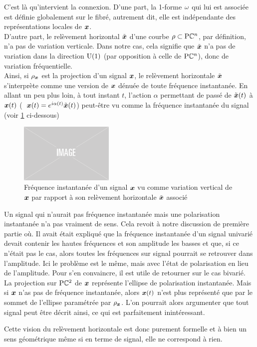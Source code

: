 C'est là qu'intervient la connexion. D'une part, la 1-forme $\omega$ qui lui est associée est définie globalement sur le fibré, autrement dit, elle est indépendante des représentations locales de $\boldsymbol{x}$.
\\
D'autre part, le relèvement horizontal $\Tilde{\boldsymbol{x}}$ d'une courbe $\rho\subset\text{\normalfont P}\mathbb{C}^{n}$, par définition, n'a pas de variation verticale. Dans notre cas, cela signifie que $\Tilde{\boldsymbol{x}}$ n'a pas de variation dans la direction $\text{\normalfont U}(1)$ (par opposition à celle de $\text{\normalfont P}\mathbb{C}^{n}$), donc de variation fréquentielle.
\\
Ainsi, si $\rho_{\boldsymbol{x}}$ est la projection d'un signal $\boldsymbol{x}$, le relèvement horizontale $\Tilde{\boldsymbol{x}}$ s'interprète comme une version de $\boldsymbol{x}$ dénuée de toute fréquence instantanée.
En allant un peu plus loin, à tout instant $t$, l'action $\alpha$ permettant de passé de $\Tilde{\boldsymbol{x}}(t)$ à $\boldsymbol{x}(t)$ (\ie~$\boldsymbol{x}(t) = e^{i\alpha(t)} \Tilde{\boldsymbol{x}}(t)$) peut-être vu comme la fréquence instantanée du signal (voir \cref{fig:freq_inst_geodiff} ci-dessous)

\begin{figure}[h]
	\includegraphics[width=0.4\textwidth]{fig/placeholder}
	\caption[Interprétation géométrique de la fréquence instantanée]{Fréquence instantanée d'un signal $\boldsymbol{x}$ vu comme variation vertical de $\boldsymbol{x}$ par rapport à son relèvement horizontale $\Tilde{\boldsymbol{x}}$ associé}
	\label{fig:freq_inst_geodiff}
\end{figure}	

\begin{remarque}
	Un signal qui n'aurait pas fréquence instantanée mais une polarisation instantanée n'a pas vraiment de sens. 
	Cela revoit à notre discussion de première partie où. Il avait était expliqué que la fréquence instantanée d'un signal univarié devait contenir les hautes fréquences et son amplitude les basses et que, si ce n'était pas le cas, alors toutes les fréquences sur signal pourrait se retrouver dans l'amplitude.
	Ici le problème est le même, mais avec l'état de polarisation en lieu de l’amplitude. Pour s'en convaincre, il est utile de retourner sur le cas bivarié.
	\\
	La projection sur $\text{\normalfont P}\mathbb{C}^{2}$ de $\boldsymbol{x}$ représente l'ellipse de polarisation instantanée. 
	Mais si $\boldsymbol{x}$ n'as pas de fréquence instantanée, alors $\boldsymbol{x}(t)$ n'est plus représenté que par le sommet de l’ellipse paramétrée par $\rho_{\boldsymbol{x}}$. 
	L'on pourrait alors argumenter que tout signal peut être décrit ainsi, ce qui est parfaitement inintéressant.
	
	Cette vision du relèvement horizontale est donc purement formelle et à bien un sens géométrique même si en terme de signal, elle ne correspond à rien.
\end{remarque}
\skipl

